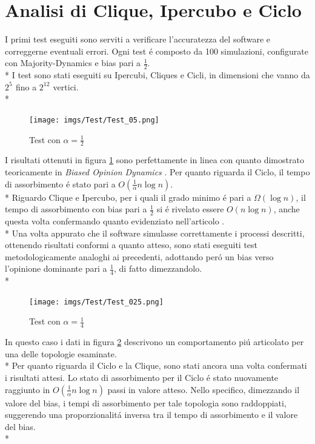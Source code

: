\documentclass[../Tesi.tex]{subfiles}
\begin{document}
\section{Analisi di Clique, Ipercubo e Ciclo}
I primi test eseguiti sono serviti a verificare l'accuratezza del software e correggerne eventuali errori. Ogni test \'e composto da 100 simulazioni, configurate con Majority-Dynamics e bias pari a $\frac{1}{2}$.\\*
I test sono stati eseguiti su Ipercubi, Cliques e Cicli, in dimensioni che vanno da $2^{5^{\mathrm{}}}$ fino a $2^{12^{\mathrm{}}}$ vertici.\\*
\begin{figure}[H]
    \centering
    \texttt{[image: imgs/Test/Test\_05.png]}
    \caption{Test con $\alpha = \frac{1}{2}$}
    \label{img:Test05}
\end{figure}
I risultati ottenuti in figura \ref{img:Test05} sono perfettamente in linea con quanto dimostrato teoricamente in \emph{Biased Opinion Dynamics} \cite{DBLP:journals/corr/abs-2008-13589}. Per quanto riguarda il Ciclo, il tempo di assorbimento \'e stato pari a $O(\frac{1}{\alpha}n\log{}n)$. \\*
Riguardo Clique e Ipercubo, per i quali il grado minimo \'e pari a $\Omega(\log{}n)$, il tempo di assorbimento con bias pari a $\frac{1}{2}$ si \'e rivelato essere $O(n\log{}n)$, anche questa volta confermando quanto evidenziato nell'articolo \cite{DBLP:journals/corr/abs-2008-13589}.\\*
Una volta appurato che il software simulasse correttamente i processi descritti, ottenendo risultati conformi a quanto atteso, sono stati eseguiti test metodologicamente analoghi ai precedenti, adottando per\'o un bias verso l'opinione dominante pari a $\frac{1}{4}$, di fatto dimezzandolo.\\*
\begin{figure}[H]
    \centering
    \texttt{[image: imgs/Test/Test\_025.png]}
    \caption{Test con $\alpha = \frac{1}{4}$}
    \label{img:Test025}
\end{figure}
In questo caso i dati in figura \ref{img:Test025} descrivono un comportamento pi\'u articolato per una delle topologie esaminate.\\*
Per quanto riguarda il Ciclo e la Clique, sono stati ancora una volta confermati i risultati attesi.
Lo stato di assorbimento per il Ciclo \'e stato nuovamente raggiunto in $O(\frac{1}{\alpha}n\log{}n)$ passi in valore atteso. Nello specifico, dimezzando il valore del bias, i tempi di assorbimento per tale topologia sono raddoppiati, suggerendo una proporzionalit\'a inversa tra il tempo di assorbimento e il valore del bias.\\*
\end{document}
